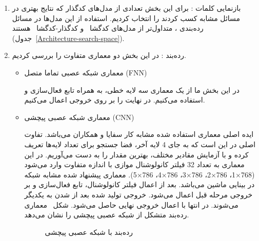 \begin{enumerate}
	\item بازنمایی کلمات
	: برای این بخش تعدادی از مدل‌های کدگذار
که نتایج بهتری در مسائل مشابه کسب کردند را انتخاب کردیم. استفاده از این مدل‌ها در مسائل رده‌بندی
، متداول‌تر از مدل‌های کدگشا‍~
و کدگذار-کدگشا~
هستند (جدول~\ref{Architecture-search-space}). 
	\item رده‌بند
	:
	در این بخش دو معماری متفاوت را بررسی کردیم.
	\begin{itemize}
		\item معماری شبکه عصبی تماما متصل (FNN)
		
در این بخش	ما از یک معماری سه لایه خطی، به همراه تابع فعال‌سازی 
		و
		استفاده ‌می‌کنیم. در نهایت
		را بر روی خروجی اعمال می‌کنیم.
				
		\item معماری شبکه عصبی پیچشی (CNN)
		
		ایده اصلی معماری استفاده شده مشابه کار سفایا و همکاران
\cite{safaya-etal-2020-kuisail}
		می‌باشد. تفاوت اصلی در این است که به جای 4 لایه آخر، فضا جستجو برای تعداد لایه‌ها تعریف کرده و با آزمایش مقادیر مختلف، بهترین مقدار را به دست می‌آوریم. در این معماری 
		به تعداد 32 فیلتر کانولوشنال موازی با اندازه متفاوت وارد می‌شود (768‍×1، 786×2، 786×3، 786×4، 786×5). معماری پیشنهاد شده مشابه شبکه
		در بینایی ماشین می‌باشد. بعد از اعمال فیلتر کانولوشنال، تابع فعال‌سازی
و 
بر خروجی مرحله قبل اعمال می‌شود. خروجی تولید شده بعد از 
شدن به یکدیگر
می‌شوند. در انتها با اعمال 
خروجی نهایی حاصل می‌شود. شکل~\cite{safaya-etal-2020-kuisail} 
معماری رده‌بند متشکل از شبکه عصبی پیچشی را نشان می‌دهد.
		
		
\begin{figure}[H]
	\caption[رده‌بند با شبکه عصبی پیچشی]{رده‌بند با شبکه عصبی پیچشی
\cite{safaya-etal-2020-kuisail}	\label{Bert_CNN}}
\end{figure}
		

\end{itemize}
\end{enumerate}
